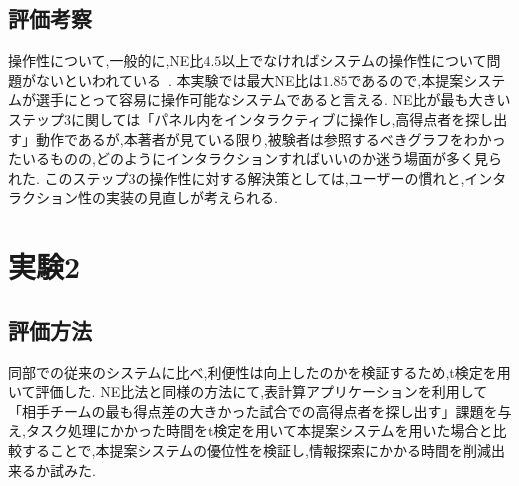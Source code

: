 \documentclass[sotsuron]{kuee}
\begin{document}
		\subsection{評価考察}
			操作性について,一般的に,NE比$4.5$以上でなければシステムの操作性について問題がないといわれている~\cite{NEMratio}.
			本実験では最大NE比は$1.85$であるので,本提案システムが選手にとって容易に操作可能なシステムであると言える.
			NE比が最も大きいステップ3に関しては「パネル内をインタラクティブに操作し,高得点者を探し出す」動作であるが,本著者が見ている限り,被験者は参照するべきグラフをわかったいるものの,どのようにインタラクションすればいいのか迷う場面が多く見られた.
			このステップ3の操作性に対する解決策としては,ユーザーの慣れと,インタラクション性の実装の見直しが考えられる.
	\section{実験2}
		\subsection{評価方法}
			同部での従来のシステムに比べ,利便性は向上したのかを検証するため,t検定を用いて評価した.
			NE比法と同様の方法にて,表計算アプリケーションを利用して「相手チームの最も得点差の大きかった試合での高得点者を探し出す」課題を与え,タスク処理にかかった時間をt検定を用いて本提案システムを用いた場合と比較することで,本提案システムの優位性を検証し,情報探索にかかる時間を削減出来るか試みた.
\end{document}
